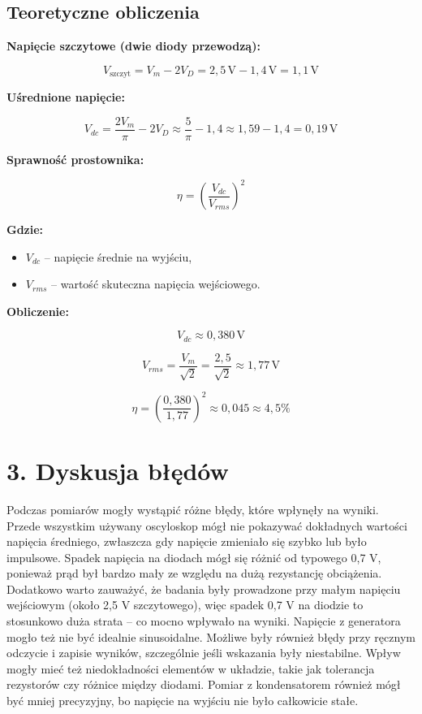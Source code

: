 \documentclass[a4paper,12pt]{article}
\begin{document}
\subsection*{Teoretyczne obliczenia}

\textbf{Napięcie szczytowe (dwie diody przewodzą):}

\[
V_{\text{szczyt}} = V_m - 2V_D = 2{,}5\,\text{V} - 1{,}4\,\text{V} = 1{,}1\,\text{V}
\]

\textbf{Uśrednione napięcie:}

\[
V_{dc} = \frac{2 V_m}{\pi} - 2 V_D \approx \frac{5}{\pi} - 1{,}4 \approx 1{,}59 - 1{,}4 = 0{,}19\,\text{V}
\]

\textbf{Sprawność prostownika:}

\[
\eta = \left( \frac{V_{dc}}{V_{rms}} \right)^2
\]

\textbf{Gdzie:}

\begin{itemize}
    \item $V_{dc}$ – napięcie średnie na wyjściu,
    \item $V_{rms}$ – wartość skuteczna napięcia wejściowego.
\end{itemize}

\textbf{Obliczenie:}

\[
V_{dc} \approx 0{,}380\,\text{V}
\]

\[
V_{rms} = \frac{V_m}{\sqrt{2}} = \frac{2{,}5}{\sqrt{2}} \approx 1{,}77\,\text{V}
\]

\[
\eta = \left( \frac{0{,}380}{1{,}77} \right)^2 \approx 0{,}045 \approx 4{,}5\%
\]
\section*{3. Dyskusja błędów}

Podczas pomiarów mogły wystąpić różne błędy, które wpłynęły na wyniki. Przede wszystkim używany oscyloskop mógł nie pokazywać dokładnych wartości napięcia średniego, zwłaszcza gdy napięcie zmieniało się szybko lub było impulsowe. Spadek napięcia na diodach mógł się różnić od typowego 0,7 V, ponieważ prąd był bardzo mały ze względu na dużą rezystancję obciążenia. Dodatkowo warto zauważyć, że badania były prowadzone przy małym napięciu wejściowym (około 2,5 V szczytowego), więc spadek 0,7 V na diodzie to stosunkowo duża strata – co mocno wpływało na wyniki. Napięcie z generatora mogło też nie być idealnie sinusoidalne.
Możliwe były również błędy przy ręcznym odczycie i zapisie wyników, szczególnie jeśli wskazania były niestabilne. Wpływ mogły mieć też niedokładności elementów w układzie, takie jak tolerancja rezystorów czy różnice między diodami. Pomiar z kondensatorem również mógł być mniej precyzyjny, bo napięcie na wyjściu nie było całkowicie stałe.
\end{document}
